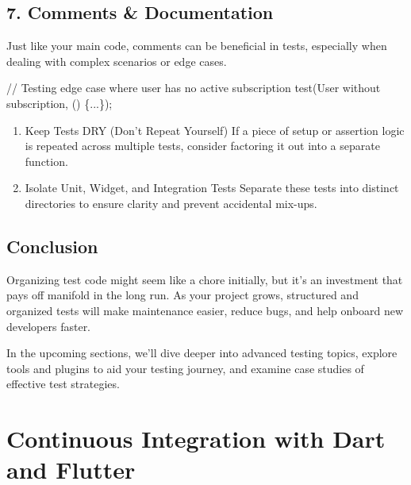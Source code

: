 \documentclass[
]{article}
\newenvironment{Shaded}{\begin{snugshade}}{\end{snugshade}}
\newcommand{\CommentTok}[1]{\textcolor[rgb]{0.48,0.49,0.49}{#1}}
\newcommand{\NormalTok}[1]{\textcolor[rgb]{0.81,0.81,0.76}{#1}}
\newcommand{\OperatorTok}[1]{\textcolor[rgb]{0.81,0.81,0.76}{#1}}
\newcommand{\StringTok}[1]{\textcolor[rgb]{0.96,0.31,0.31}{#1}}
\begin{document}
\subsection{7. Comments \& Documentation}\label{comments-documentation}

Just like your main code, comments can be beneficial in tests,
especially when dealing with complex scenarios or edge cases.

\begin{Shaded}
\begin{Highlighting}[]
\CommentTok{// Testing edge case where user has no active subscription}
\NormalTok{test(}\StringTok{\textquotesingle{}User without subscription\textquotesingle{}}\OperatorTok{,}\NormalTok{ () }\OperatorTok{\{...\}}\NormalTok{);}
\end{Highlighting}
\end{Shaded}

\begin{enumerate}
\def\labelenumi{\arabic{enumi}.}
\setcounter{enumi}{7}
\item
  Keep Tests DRY (Don't Repeat Yourself) If a piece of setup or
  assertion logic is repeated across multiple tests, consider factoring
  it out into a separate function.
\item
  Isolate Unit, Widget, and Integration Tests Separate these tests into
  distinct directories to ensure clarity and prevent accidental mix-ups.
\end{enumerate}

\subsection{Conclusion}\label{conclusion-11}

Organizing test code might seem like a chore initially, but it's an
investment that pays off manifold in the long run. As your project
grows, structured and organized tests will make maintenance easier,
reduce bugs, and help onboard new developers faster.

In the upcoming sections, we'll dive deeper into advanced testing
topics, explore tools and plugins to aid your testing journey, and
examine case studies of effective test strategies.

\section{Continuous Integration with Dart and
Flutter}\label{continuous-integration-with-dart-and-flutter}
\end{document}
